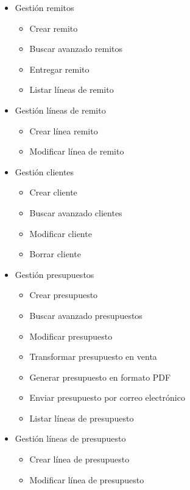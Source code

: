 \begin{itemize}
\begin{itemize}
            \item Gestión remitos
            \begin{itemize}
                \item Crear remito
                \item Buscar avanzado remitos
                \item Entregar remito
                \item Listar líneas de remito
            \end{itemize}
            \item Gestión líneas de remito
            \begin{itemize}
                \item Crear línea remito
                \item Modificar línea de remito
            \end{itemize}
            \item Gestión clientes
            \begin{itemize}
                \item Crear cliente
                \item Buscar avanzado clientes
                \item Modificar cliente
                \item Borrar cliente
            \end{itemize}
            \item Gestión presupuestos
            \begin{itemize}
                \item Crear presupuesto
                \item Buscar avanzado presupuestos
                \item Modificar presupuesto
                \item Transformar presupuesto en venta
                \item Generar presupuesto en formato PDF
                \item Enviar presupuesto por correo electrónico
                \item Listar líneas de presupuesto
            \end{itemize}
            \item Gestión líneas de presupuesto
            \begin{itemize}
                \item Crear línea de presupuesto
                \item Modificar línea de presupuesto

\end{itemize}
\end{itemize}
\end{itemize}
